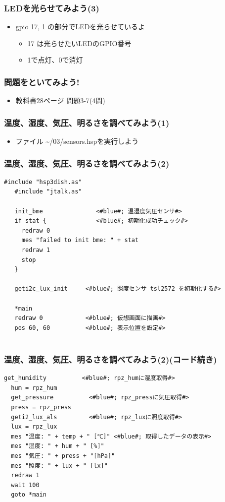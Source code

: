 \begin{frame}
  \frametitle{LEDを光らせてみよう(3)}
  \begin{itemize}
    \item gpio 17, 1 の部分でLEDを光らせているよ
          \begin{itemize}
            \item 17 は光らせたいLEDのGPIO番号
            \item 1で点灯、0で消灯
          \end{itemize}
  \end{itemize}
\end{frame}

\begin{frame}
  \frametitle{問題をといてみよう!}
  \begin{itemize}
    \item 教科書28ページ 問題3-7(4問)
  \end{itemize}
\end{frame}

\begin{frame}
  \frametitle{温度、湿度、気圧、明るさを調べてみよう(1)}
  \begin{itemize}
    \item ファイル \rightarrow \sim/03/sensors.hspを実行しよう
  \end{itemize}
\end{frame}

\begin{frame}[fragile]
  \frametitle{温度、湿度、気圧、明るさを調べてみよう(2)}
  \begin{lstlisting}[title=sensors.hsp, label=sensors.hsp]
   #include "hsp3dish.as"    
   #include "jtalk.as"    

   init_bme               <#blue#; 温湿度気圧センサ#>
   if stat {              <#blue#; 初期化成功チェック#>
     redraw 0          
     mes "failed to init bme: " + stat
     redraw 1
     stop
   }

   geti2c_lux_init     <#blue#; 照度センサ tsl2572 を初期化する#>

   *main
   redraw 0            <#blue#; 仮想画面に描画#>
   pos 60, 60          <#blue#; 表示位置を設定#>
  
  \end{lstlisting}
\end{frame}

\begin{frame}[fragile]
  \frametitle{温度、湿度、気圧、明るさを調べてみよう(2)(コード続き)}
  \begin{lstlisting}[title=sensors.hsp, label=sensors.hsp]
  get_humidity          <#blue#; rpz_humに湿度取得#>
  hum = rpz_hum       
  get_pressure          <#blue#; rpz_pressに気圧取得#>
  press = rpz_press
  geti2_lux_als         <#blue#; rpz_luxに照度取得#>
  lux = rpz_lux
  mes "温度: " + temp + " [℃]" <#blue#; 取得したデータの表示#>
  mes "湿度: " + hum + " [%]"
  mes "気圧: " + press + "[hPa]"
  mes "照度: " + lux + " [lx]"
  redraw 1              
  wait 100
  goto *main
  \end{lstlisting}
\end{frame}

